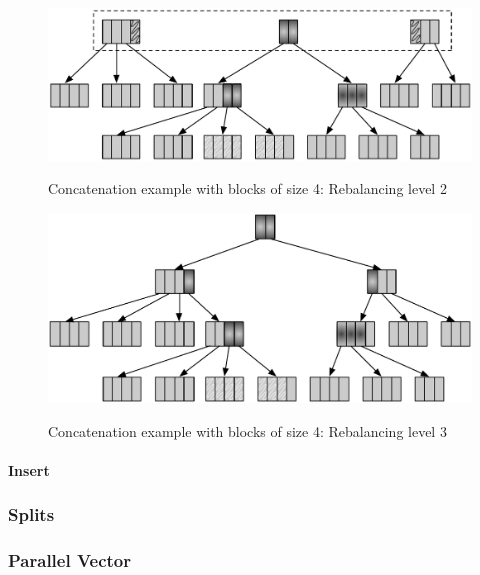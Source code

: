 \begin{figure}[h!]
  \centering
  \includegraphics[width=\textwidth]{Figures/Concat2.pdf}
  \label{Concat2Benchmarks}
  \caption{Concatenation example with blocks of size 4: Rebalancing level 2}
\end{figure}

\begin{figure}[h!]
  \centering
  \includegraphics[width=\textwidth]{Figures/Concat3.pdf}
  \label{Concat3Benchmarks}
  \caption{Concatenation example with blocks of size 4: Rebalancing level 3}
\end{figure}


\paragraph{Insert}




\subsubsection{Splits}


\subsubsection{Parallel Vector}


